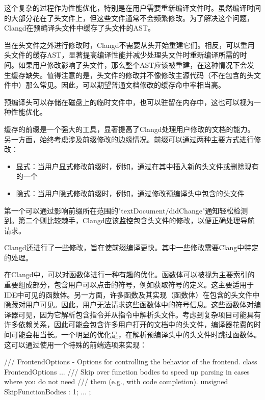 这个复杂的过程作为性能优化，特别是在用户需要重新编译文件时。虽然编译时间的大部分花在了头文件上，但这些文件通常不会频繁修改。为了解决这个问题，Clangd在预编译头文件中缓存了头文件的AST。

当在头文件之外进行修改时，Clangd不需要从头开始重建它们。相反，可以重用头文件的缓存AST，显著提高编译性能并减少处理头文件时重新编译所需的时间。如果用户修改影响了头文件，那么整个AST应该被重建，在这种情况下会发生缓存缺失。值得注意的是，头文件的修改并不像修改主源代码（不在包含的头文件中）那么常见。因此，可以期望普通文档修改的缓存命中率相当高。

预编译头可以存储在磁盘上的临时文件中，也可以驻留在内存中，这也可以视为一种性能优化。

缓存的前缀是一个强大的工具，显著提高了Clangd处理用户修改的文档的能力。另一方面，始终考虑涉及前缀修改的边缘情况。前缀可以通过两种主要方式进行修改：

\begin{itemize}
\item
显式：当用户显式修改前缀时，例如，通过在其中插入新的头文件或删除现有的一个

\item
隐式：当用户隐式修改前缀时，例如，通过修改预编译头中包含的头文件
\end{itemize}

第一个可以通过影响前缀所在范围的"textDocument/didChange"通知轻松检测到。第二个则比较棘手，Clangd应该监控包含头文件的修改，以便正确处理导航请求。

Clangd还进行了一些修改，旨在使前缀编译更快。其中一些修改需要Clang中特定的处理。


在Clangd中，可以对函数体进行一种有趣的优化。函数体可以被视为主要索引的重要组成部分，包含用户可以点击的符号，例如获取符号的定义。这主要适用于IDE中可见的函数体。另一方面，许多函数及其实现（函数体）在包含的头文件中隐藏对用户可见。因此，用户无法请求这些函数体中的符号信息。这些函数体对编译器可见，因为它解析包含指令并从指令中解析头文件。考虑到复杂项目可能具有许多依赖关系，因此可能会包含许多用户打开的文档中的头文件，编译器花费的时间可能会相当长。一个明显的优化是，在解析预编译头中的头文件时跳过函数体。这可以通过使用一个特殊的前端选项来实现：

\begin{cpp}
/// FrontendOptions - Options for controlling the behavior of the frontend.
class FrontendOptions {
  ...
  /// Skip over function bodies to speed up parsing in cases where you do not need
  /// them (e.g., with code completion).
  unsigned SkipFunctionBodies : 1;
  ...
};
\end{cpp}

